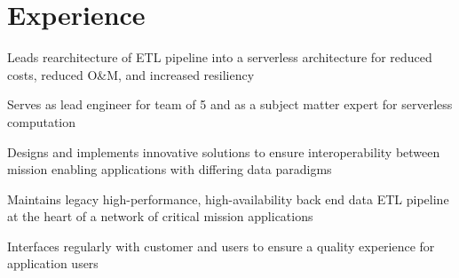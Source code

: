 \documentclass[]{resume}
\begin{document}
\begin{minipage}[t]{0.69\textwidth}


\section{Experience}

\vspace{\topsep} %
\begin{tightemize}
\end{tightemize}

\sectionsep

\begin{tightemize}
\item Leads rearchitecture of ETL pipeline into a serverless architecture for reduced costs, reduced O\&M, and increased resiliency
\item Serves as lead engineer for team of 5 and as a subject matter expert for serverless computation
\item Designs and implements innovative solutions to ensure interoperability between mission enabling applications with differing data paradigms
\item Maintains legacy high-performance, high-availability back end data ETL pipeline at the heart of a network of critical mission applications
\item Interfaces regularly with customer and users to ensure a quality experience for application users
\end{tightemize}


\end{minipage}
\end{document}
